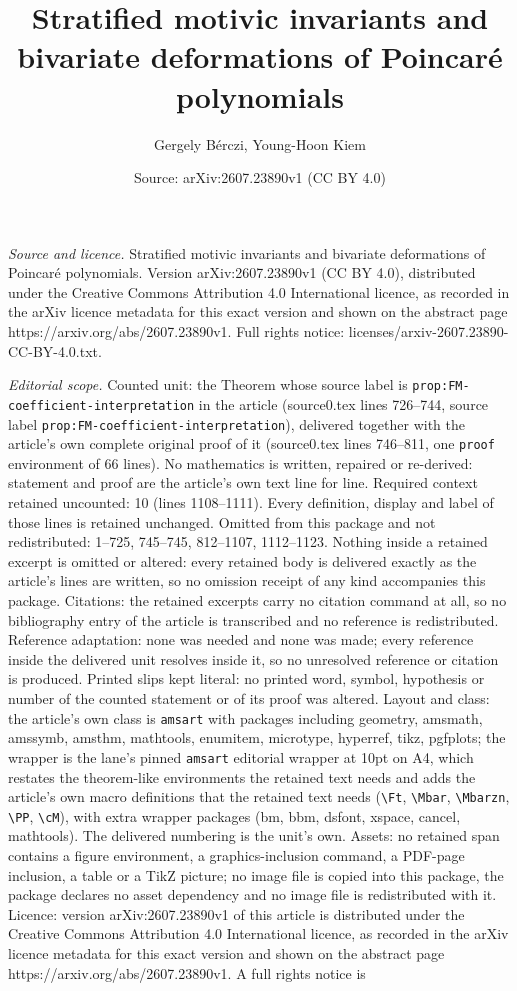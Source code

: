 \documentclass[10pt,a4paper]{amsart}
\title[Stratified motivic invariants and bivariate deformations of ]{Stratified motivic invariants and bivariate deformations of Poincar\'e polynomials}
\author{Gergely B\'erczi, Young-Hoon Kiem}
\date{Source: arXiv:2607.23890v1 (CC BY 4.0)}
\begin{document}
\maketitle

\noindent\emph{Source and licence.} Stratified motivic invariants and bivariate deformations of Poincar\'e polynomials. Version arXiv:2607.23890v1 (CC BY 4.0), distributed under the Creative Commons Attribution 4.0 International licence, as recorded in the arXiv licence metadata for this exact version and shown on the abstract page https://arxiv.org/abs/2607.23890v1. Full rights notice: licenses/arxiv-2607.23890-CC-BY-4.0.txt.\par\smallskip

\noindent\textit{Editorial scope.} Counted unit: the Theorem whose source label is \texttt{prop:FM-coefficient-interpretation} in the article (source0.tex lines 726--744, source label \texttt{prop:FM-coefficient-interpretation}), delivered together with the article's own complete original proof of it (source0.tex lines 746--811, one \texttt{proof} environment of 66 lines). No mathematics is written, repaired or re-derived: statement and proof are the article's own text line for line. Required context retained uncounted: 10 (lines 1108--1111). Every definition, display and label of those lines is retained unchanged. Omitted from this package and not redistributed: 1--725, 745--745, 812--1107, 1112--1123. Nothing inside a retained excerpt is omitted or altered: every retained body is delivered exactly as the article's lines are written, so no omission receipt of any kind accompanies this package. Citations: the retained excerpts carry no citation command at all, so no bibliography entry of the article is transcribed and no reference is redistributed. Reference adaptation: none was needed and none was made; every reference inside the delivered unit resolves inside it, so no unresolved reference or citation is produced. Printed slips kept literal: no printed word, symbol, hypothesis or number of the counted statement or of its proof was altered. Layout and class: the article's own class is \texttt{amsart} with packages including geometry, amsmath, amssymb, amsthm, mathtools, enumitem, microtype, hyperref, tikz, pgfplots; the wrapper is the lane's pinned \texttt{amsart} editorial wrapper at 10pt on A4, which restates the theorem-like environments the retained text needs and adds the article's own macro definitions that the retained text needs (\texttt{\textbackslash Ft}, \texttt{\textbackslash Mbar}, \texttt{\textbackslash Mbarzn}, \texttt{\textbackslash PP}, \texttt{\textbackslash cM}), with extra wrapper packages (bm, bbm, dsfont, xspace, cancel, mathtools). The delivered numbering is the unit's own. Assets: no retained span contains a figure environment, a graphics-inclusion command, a PDF-page inclusion, a table or a TikZ picture; no image file is copied into this package, the package declares no asset dependency and no image file is redistributed with it. Licence: version arXiv:2607.23890v1 of this article is distributed under the Creative Commons Attribution 4.0 International licence, as recorded in the arXiv licence metadata for this exact version and shown on the abstract page https://arxiv.org/abs/2607.23890v1. A full rights notice is 
\end{document}
